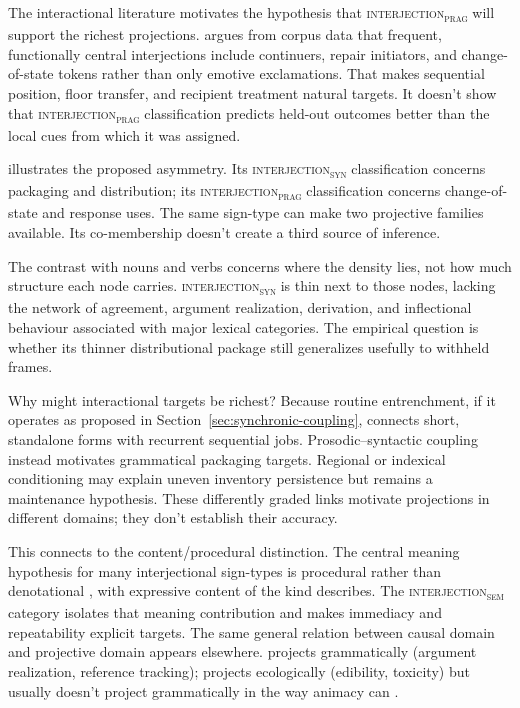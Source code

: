 \documentclass[12pt]{article}
\newcommand{\intj}[1]{\textsc{interjection\textsubscript{#1}}}
\begin{document}
The interactional literature motivates the hypothesis that
\intj{prag} will support the richest projections.
\textcite[257--259, 263]{dingemanse2024} argues from corpus data that frequent, functionally central
interjections include continuers, repair initiators, and change-of-state
tokens rather than only emotive exclamations. That makes sequential position,
floor transfer, and recipient treatment natural targets. It doesn't show
that \intj{prag} classification predicts held-out outcomes better than the
local cues from which it was assigned.

 illustrates the proposed asymmetry. Its \intj{syn}
classification concerns packaging and distribution; its \intj{prag}
classification concerns change-of-state and response uses. The same sign-type
can make two projective families available. Its co-membership
doesn't create a third source of inference.

The contrast with nouns and verbs concerns where the density lies, not how
much structure each node carries.
\intj{syn} is thin next to those nodes, lacking
the network of agreement, argument realization, derivation, and inflectional
behaviour associated with major lexical categories. The empirical question is
whether its thinner distributional package still generalizes usefully to
withheld frames.

Why might interactional targets be richest? Because routine entrenchment, if
it operates as proposed in Section~\ref{sec:synchronic-coupling}, connects
short, standalone forms with recurrent sequential jobs. Prosodic--syntactic
coupling instead motivates grammatical packaging targets. Regional or
indexical conditioning may explain uneven inventory persistence but remains a
maintenance hypothesis. These differently graded links motivate projections
in different domains; they don't establish their accuracy.

This connects to the content/procedural distinction. The central
meaning hypothesis for many interjectional sign-types is procedural rather
than denotational \citep[cf.][10, 40]{TraugottDasher2002}, with expressive
content of the kind \textcite[166--167]{potts2007} describes. The
\intj{sem} category isolates that meaning contribution and makes immediacy
and repeatability explicit targets. The same general relation between causal
domain and projective domain appears elsewhere.  projects grammatically (argument realization,
reference tracking);  projects ecologically (edibility,
toxicity) but usually doesn't project grammatically in the way animacy
can \citep[cf.][726]{seifart2010}.
\end{document}
